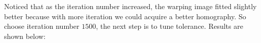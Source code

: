\documentclass[11pt]{article} \usepackage{fullpage} \usepackage{graphicx} \usepackage{epstopdf} \usepackage{color} \usepackage{psfrag} \usepackage{pdfsync}\usepackage{indentfirst}\usepackage{subfigure}\usepackage{float}\usepackage[section]{placeins}
\begin{document}
\begin{figure}[H]
\end{figure}

Noticed that as the iteration number increased, the warping image fitted slightly better because with more iteration we could acquire a better homography. So choose iteration number $1500$, the next step is to tune tolerance. Results are shown below:
\end{document}
